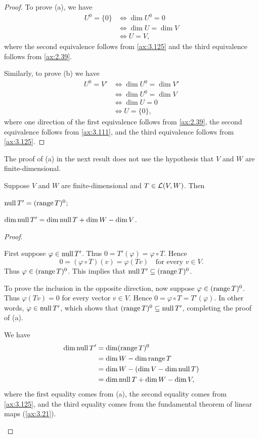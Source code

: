\begin{proof}
To prove (a), we have
\begin{align*}
U^0=\{0\} &\iff \dim U^0=0\\
          &\iff \dim U=\dim V\\
          &\iff U=V,
\end{align*}
where the second equivalence follows from \ref{ax:3.125} and the third
equivalence follows from \ref{ax:2.39}.

Similarly, to prove (b) we have
\begin{align*}
U^0=V' &\iff \dim U^0=\dim V'\\
       &\iff \dim U^0=\dim V\\
       &\iff \dim U=0\\
       &\iff U=\{0\},
\end{align*}
where one direction of the first equivalence follows from \ref{ax:2.39}, the
second equivalence follows from \ref{ax:3.111}, and the third equivalence
follows from \ref{ax:3.125}.
\end{proof}

The proof of (a) in the next result does not use the hypothesis that $V$ and
$W$ are finite-dimensional.

\begin{result}\label{ax:3.128}
Suppose $V$ and $W$ are finite-dimensional and $T\in\mathcal{L}(V,W)$. Then
\begin{parts}
\item $\operatorname{null} T'=(\operatorname{range} T)^0$;
\item $\operatorname{dim}\operatorname{null} T'=\operatorname{dim}\operatorname{null} T+\operatorname{dim} W-\operatorname{dim} V$.
\end{parts}
\end{result}

\begin{proof}\leavevmode
\begin{parts}
\item First suppose $\varphi\in\operatorname{null} T'$. Thus $0=T'(\varphi)=\varphi\circ T$.
  Hence
  \[ 0 = (\varphi\circ T)(v) = \varphi(Tv) \quad\text{for every } v\in V. \]
  Thus $\varphi\in(\operatorname{range} T)^0$. This implies that
  $\operatorname{null} T'\subseteq(\operatorname{range} T)^0$.

  To prove the inclusion in the opposite direction, now suppose
  $\varphi\in(\operatorname{range} T)^0$. Thus $\varphi(Tv)=0$ for every vector $v\in V$.
  Hence $0=\varphi\circ T=T'(\varphi)$. In other words, $\varphi\in\operatorname{null} T'$,
  which shows that $(\operatorname{range} T)^0\subseteq\operatorname{null} T'$, completing the proof of (a).
\item We have
  \begin{align*}
  \operatorname{dim}\operatorname{null} T' &= \operatorname{dim}(\operatorname{range} T)^0\\
              &= \operatorname{dim} W-\operatorname{dim}\operatorname{range} T\\
              &= \operatorname{dim} W-(\operatorname{dim} V-\operatorname{dim}\operatorname{null} T)\\
              &= \operatorname{dim}\operatorname{null} T+\operatorname{dim} W-\operatorname{dim} V,
  \end{align*}
  where the first equality comes from (a), the second equality comes from
  \ref{ax:3.125}, and the third equality comes from the fundamental theorem of
  linear maps (\ref{ax:3.21}). \qedhere
\end{parts}
\end{proof}

